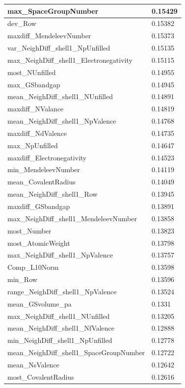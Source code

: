 \begin{longtable}{|l|l|}
max\_SpaceGroupNumber & 0.15429 \\ \hline
dev\_Row & 0.15382 \\ \hline
maxdiff\_MendeleevNumber & 0.15373 \\ \hline
var\_NeighDiff\_shell1\_NpUnfilled & 0.15135 \\ \hline
max\_NeighDiff\_shell1\_Electronegativity & 0.15115 \\ \hline
most\_NUnfilled & 0.14955 \\ \hline
max\_GSbandgap & 0.14945 \\ \hline
mean\_NeighDiff\_shell1\_NUnfilled & 0.14891 \\ \hline
maxdiff\_NValance & 0.14819 \\ \hline
mean\_NeighDiff\_shell1\_NpValence & 0.14768 \\ \hline
maxdiff\_NdValence & 0.14735 \\ \hline
max\_NpUnfilled & 0.14647 \\ \hline
maxdiff\_Electronegativity & 0.14523 \\ \hline
min\_MendeleevNumber & 0.14119 \\ \hline
mean\_CovalentRadius & 0.14049 \\ \hline
mean\_NeighDiff\_shell1\_Row & 0.13945 \\ \hline
maxdiff\_GSbandgap & 0.13891 \\ \hline
max\_NeighDiff\_shell1\_MendeleevNumber & 0.13858 \\ \hline
most\_Number & 0.13823 \\ \hline
most\_AtomicWeight & 0.13798 \\ \hline
max\_NeighDiff\_shell1\_NpValence & 0.13757 \\ \hline
Comp\_L10Norm & 0.13598 \\ \hline
min\_Row & 0.13596 \\ \hline
range\_NeighDiff\_shell1\_NpValence & 0.13524 \\ \hline
mean\_GSvolume\_pa & 0.1331 \\ \hline
max\_NeighDiff\_shell1\_NUnfilled & 0.13205 \\ \hline
mean\_NeighDiff\_shell1\_NfValence & 0.12888 \\ \hline
min\_NeighDiff\_shell1\_NpUnfilled & 0.12778 \\ \hline
mean\_NeighDiff\_shell1\_SpaceGroupNumber & 0.12722 \\ \hline
mean\_NsValence & 0.12642 \\ \hline
most\_CovalentRadius & 0.12616 \\ \hline

\end{longtable}
